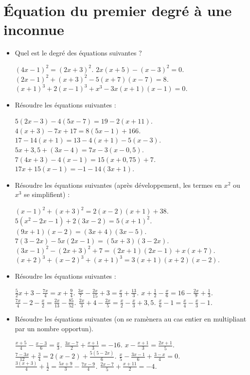 \chapter{Équation du premier degré à une inconnue}


\begin{itemize}
\item Quel est le degré des équations suivantes ? \begin{itemize}
\it $(4x-1)^2=(2x+3)^2$.
\it $2x(x+5)-(x-3)^2=0$.
\it $(2x-1)^2+(x+3)^2-5(x+7)(x-7)=8$.
\it $(x+1)^3+2(x-1)^3+x^3-3x(x+1)(x-1)=0$.
\end{itemize}
\item Résoudre les équations suivantes : 
\begin{itemize}
\it $5(2x-3) - 4(5x-7)=19-2(x+11)$. 
\it $4(x+3)-7x+17 = 8(5x-1)+166$. 
\it $17-14(x+1)= 13-4(x+1)-5(x-3)$. 
\it $5x+3,5+(3x-4) = 7x-3(x-0,5)$. 
\it $7(4x+3)-4(x-1)=15(x+0,75)+7$. 
\it $17x+15(x-1)=-1-14(3x+1)$. 
\end{itemize}
\item Résoudre les équations suivantes (après développement, les termes en $x^2$ ou $x^3$ se simplifient) : 
\begin{itemize}
\it $(x-1)^2+(x+3)^2= 2(x-2)(x+1)+38$.
\it $5(x^2-2x-1)+2(3x-2)=5(x+1)^2$.
\it $(9x+1)(x-2)=(3x+4)(3x-5)$.
\it $7(3-2x)-5x(2x-1)=(5x+3)(3-2x)$. 
\it $(3x-1)^2-(2x+3)^2+7 = (2x+1)(2x-1) + x(x+7)$.
\it $(x+2)^3+(x-2)^3+(x+1)^3=3(x+1)(x+2)(x-2)$.
\end{itemize}
\item Résoudre les équations suivantes : 
\begin{itemize}
\it $\frac52x+3 - \frac{7x}4 = x + \frac94$. 
\it $\frac{3x}7 - \frac{2x}{15} + 3 = \frac{x}3+\frac{13}3$.
\it $x+\frac12-\frac{x}6 = 16 - \frac{2x}9 + \frac13$. 
\it $\frac{7x}4-2-\frac{x}2=\frac{2x}{13}-\frac{85}{52}$. 
\it $\frac{2x}3+4 -\frac{2x}5 = \frac{x}2-\frac{x}3+3,5$. 
\it $\frac{x}6-1=\frac{x}4-\frac{x}3-1$. 
\end{itemize}
\item Résoudre les équations suivantes (on se ramènera au cas entier en multipliant par un nombre opportun).
\begin{itemize}
\it $\frac{x+5}4 - \frac{x-3}6 = \frac{x}3$. 
\it $\frac{3x-7}2 + \frac{x+1}3 = -16$. 
\it $x-\frac{x+1}3 = \frac{2x+1}5$. 
\it $\frac{7-3x}{12} + \frac34 = 2(x-2) + \frac{5(5-2x)}6$. 
\it $\frac{x}5 - \frac{3x-1}6 + \frac{3-x}4 = 0$.
\it $\frac{3(x+3)}4 + \frac12 = \frac{5x+9}3 - \frac{7x-9}4$. 
\it $\frac{2x-7}5 + \frac{x+11}2 = -4$. 

\end{itemize}
\end{itemize}
